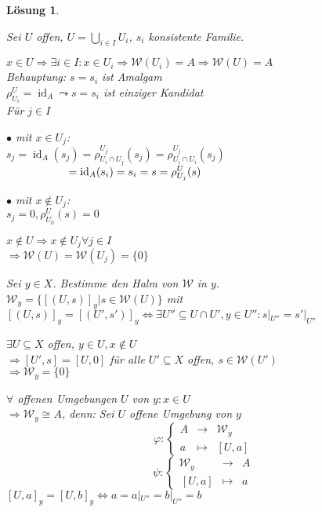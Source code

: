 \documentclass[a4paper,12pt]{report}
\theoremstyle{break}
\newtheorem{Loes}{L\"osung}
\theoremstyle{nonumberbreak}
\theoremstyle{nonumberplain}
\DeclareMathOperator{\id}{id}
\newcommand{\calW}{\mathcal{W}}
\begin{document}
\begin{Loes}\begin{enumerate}[a)]
\item
  Sei $U$ offen, $U = \bigcup\limits_{i\in I} U_i$, $s_i$ konsistente Familie.
  \begin{description}[\setlabelstyle{\itshape}]
  \item[Fall 1:]
    $x \in U \Rightarrow \exists i \in I: x\in U_i \Rightarrow \calW(U_i) = A \Rightarrow  \calW(U) = A$\\
    \emph{Behauptung:} $s=s_i$ ist Amalgam\\
    $\rho_{U_i}^U= \id_A \leadsto s = s_i$ ist einziger Kandidat\\
    F\"ur $j\in I$\begin{description}
    \item{$\bullet$ mit $x\in U_j$:}\\
      $s_j = \id_A(s_j) = \rho_{U_i\cap U_j}^{U_j}(s_j) = \rho_{U_i\cap U_i}^{U_j}(s_j)$\\
      $\textcolor{white}{s_j = \id_A(s_j)}= \id_A(s_i) = s_i = s = \rho_{U_j}^U(s)$
    \item{$\bullet$ mit $x\notin U_j$:}\\
      $s_j = 0, \rho_{U_0}^U(s) = 0$
    \end{description}
  \item[Fall 2:]
    $x \notin U \Rightarrow x\notin U_j \forall j \in I$\\
    $\Rightarrow \calW(U) = \calW(U_j) = \{0\}$
  \end{description}
\item
  Sei $y \in X$. Bestimme den Halm von $\calW$ in $y$.\\
  $\calW_y = \{[(U,s)]_y \vert s\in \calW(U)\}$ mit $[(U,s)]_y = [(U',s')]_y \Leftrightarrow \exists U'' \subseteq U \cap U', y \in U'': s|_{U''} = s'|_{U''}$ \begin{description}[\setlabelstyle{\itshape}]
  \item[Fall 1:]$\exists U\subseteq X$ offen, $y\in U, x\notin U$\\
    $\Rightarrow [U',s] = [U,0]$ f\"ur alle $U'\subseteq X$ offen, $s\in \calW(U')$\\
    $\Rightarrow \calW_y = \{0\}$
  \item[Fall 2:] $\forall$ offenen Umgebungen $U$ von $y: x\in U$\\
    $\Rightarrow \calW_y \cong A$, \emph{denn:} Sei $U$ offene Umgebung von $y$
      \[ \varphi:\left\{\begin{array}{rcl} A &\to& \calW_y \\
      a &\mapsto& [U,a]\end{array}\right.\]
      \[\psi:\left\{\begin{array}{rcl} \calW_y &\to& A \\
      \,[U,a] &\mapsto& a\end{array}\right.\]
    $[U,a]_y = [U,b]_y \Leftrightarrow a=a|_{U''} = b|_{U''} = b$
  \end{description}
  
\end{enumerate}\end{Loes}
\end{document}

